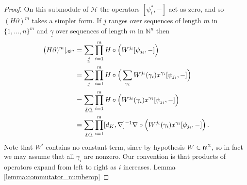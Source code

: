 \documentclass[english,letter paper,12pt,leqno]{article}
\theoremstyle{example}
\numberwithin{equation}{section}
\begin{document}
\begin{proof}
On this submodule of $\mathscr{H}$ the operators $[\psi_i^*,-]$ act as zero, and so $(H \partial)^m$ takes a simpler form. If $\underline{j}$ ranges over sequences of length $m$ in $\{1,\ldots,n\}^m$ and $\underline{\gamma}$ over sequences of length $m$ in $\mathbb{N}^n$ then
\begin{align*}
\big( H \partial )^m \arrowvert_{\mathscr{H}'} &= \sum_{\underline{j}} \prod_{i=1}^m H \circ \Big( W^{j_i} [ \psi_{j_i}, - ] \Big)\\
&= \sum_{\underline{j}} \prod_{i=1}^m H \circ \Big( \sum_{\gamma_i} W^{j_i}(\gamma_i) x^{\gamma_i} [ \psi_{j_i}, - ] \Big)\\
&= \sum_{\underline{j}, \underline{\gamma}} \prod_{i=1}^m H \circ \Big( W^{j_i}(\gamma_i) x^{\gamma_i} [ \psi_{j_i}, - ] \Big)\\
&= \sum_{\underline{j}, \underline{\gamma}} \prod_{i=1}^m [d_K, \nabla]^{-1} \nabla \circ \Big( W^{j_i}(\gamma_i) x^{\gamma_i} [ \psi_{j_i}, - ] \Big)\,.
\end{align*}
Note that $W^i$ contains no constant term, since by hypothesis $W \in \mathfrak{m}^2$, so in fact we may assume that all $\gamma_i$ are nonzero. Our convention is that products of operators expand from left to right as $i$ increases. Lemma \ref{lemma:commutator_numberop}


\end{proof}
\end{document}
